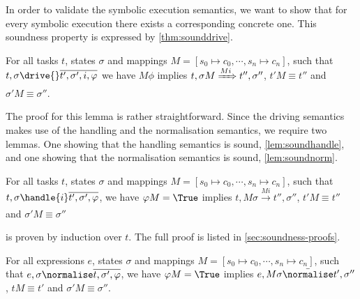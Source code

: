 %

In order to validate the symbolic execution semantics, we want to show that for every symbolic execution there exists a corresponding concrete one.
This soundness property is expressed by \cref{thm:sounddrive}.

\begin{theorem}
  \label{thm:sounddrive}

  For all tasks $t$, states $\sigma$ and mappings $M=[s_0\mapsto c_0,\cdots,s_n\mapsto c_n]$,
  such that $t,\sigma\drive{} \overline{t',\sigma',i,\phi}$
  we have $M\phi$ implies
  $t,\sigma M \xRightarrow[]{M i} t'',\sigma''$, $t'M \equiv t''$ and $\sigma' M \equiv \sigma''$.
\end{theorem}

The proof for this lemma is rather straightforward.
Since the driving semantics makes use of the handling and the normalisation semantics, we require two lemmas.
One showing that the handling semantics is sound, \cref{lem:soundhandle}, and one showing that the normalisation semantics is sound, \cref{lem:soundnorm}.

\begin{lemma}
  \label{lem:soundhandle}

  For all tasks $t$, states $\sigma$ and mappings $M = [s_0\mapsto c_0,\cdots,s_n\mapsto c_n]$,
  such that $t,\sigma\handle{i} \overline{t',\sigma',\phi}$,
  we have $\phi M = \True$ implies
  $t,M \sigma \xrightarrow[]{M i} t'',\sigma''$, $t'M \equiv t'' $ and $\sigma' M \equiv \sigma''$
\end{lemma}

 is proven by induction over $t$.
The full proof is listed in \cref{sec:soundness-proofs}.

\begin{lemma}
  \label{lem:soundnorm}

  For all expressions $e$, states $\sigma$ and mappings $M=[s_0\mapsto c_0,\cdots,s_n\mapsto c_n]$,
  such that $e,\sigma\normalise \overline{t,\sigma',\phi}$,
  we have $\phi M =\True$ implies
  $e,M \sigma \bar{\normalise}t',\sigma''$, $t M \equiv t'$ and $\sigma' M \equiv \sigma''$.

\end{lemma}

